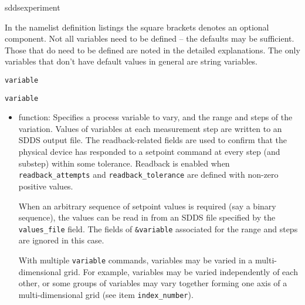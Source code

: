 \begin{sddsprog}{sddsexperiment}
\begin{itemize}
In the namelist definition listings the square brackets denotes an optional component.
Not all variables need to be defined -- the defaults may be sufficient.
Those that do need to be defined are noted in the detailed explanations.
The only variables that don't have default values in general are string variables.


\begin{latexonly}
\newpage\begin{center}{\Large \verb+variable+}\end{center}
\end{latexonly}
\begin{htmlonly}
\item {\Large \verb+variable+}
\end{htmlonly}
\begin{itemize}
        \item function: Specifies a process variable to vary, and the range and steps of the variation.
        Values of variables at each measurement step are written to an SDDS output file.
        The readback-related fields are used to confirm that the physical device has responded 
        to a setpoint command at every step (and substep) within some tolerance. Readback is enabled
        when {\verb+readback_attempts+} and {\verb+readback_tolerance+} are defined with non-zero positive values.

        When an arbitrary sequence of setpoint values is required (say a binary sequence), 
        the values can be read in from an SDDS file specified by the {\verb+values_file+} field. 
        The fields of \verb+&variable+ associated for the range and steps are ignored in this case.

         With multiple \verb+variable+ commands,
         variables may be varied in a multi-dimensional grid. For example,
        variables may be varied independently of each other, or some groups of
        variables may vary together forming one axis of a multi-dimensional grid
         (see item {\verb+index_number+}). 


\end{itemize}
\end{itemize}
\end{sddsprog}
